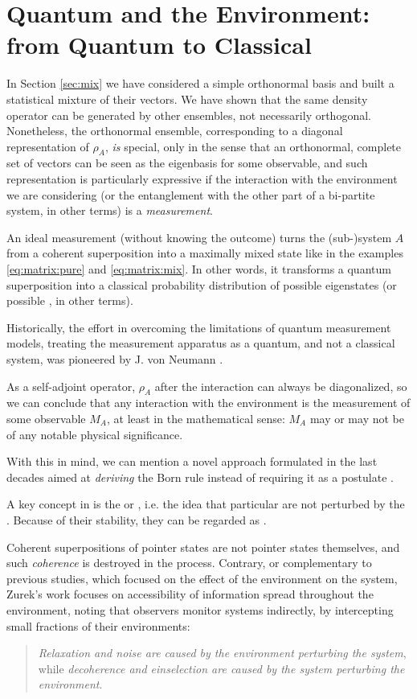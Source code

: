 \section{Quantum and the Environment: from Quantum to Classical}
\label{sec:q2c}

In Section \ref{sec:mix} we have considered a simple orthonormal basis
and built a statistical mixture of their vectors. We have shown
that the same density operator can be generated by other ensembles,
not necessarily orthogonal. Nonetheless, the orthonormal ensemble,
corresponding to a diagonal representation of $\rho_A$, \emph{is}
special, only in the sense that an orthonormal, complete set of
vectors can be seen as the eigenbasis for some observable,
and such representation is particularly expressive if the
interaction with the environment we are considering
(or the entanglement with the other part of a bi-partite system, in other terms)
is a \emph{measurement}.

An ideal measurement (without knowing the outcome) turns
the (sub-)system $A$ from a coherent superposition into a
maximally mixed state like in the examples
\eqref{eq:matrix:pure} and \eqref{eq:matrix:mix}.
In other words, it transforms a quantum superposition into a classical probability
distribution of possible eigenstates (or possible , in other terms).

Historically,
the effort in overcoming the limitations of quantum measurement models,
treating the measurement apparatus as a quantum,
and not a classical system,
was pioneered by J. von Neumann \parencite{VonNeumann}.

As a self-adjoint operator, $\rho_A$ after the interaction
can always be diagonalized, so we can conclude that any
interaction with the environment is the measurement of some
observable $M_A$, at least in the mathematical sense: $M_A$ may or
may not be of any notable physical significance.

With this in mind, we can mention
a novel approach formulated in the last decades aimed at
\emph{deriving}
the Born rule
instead of requiring it as a postulate
\parencite{Zurek_Einselect}.

A key concept in \cite{Zurek_Einselect} is the
 or ,
i.e. the idea that particular  are not
perturbed by the .
Because of their stability, they can be regarded as
.

Coherent superpositions of pointer states are not pointer states
themselves, and such \emph{coherence} is destroyed in the process. 
Contrary,
or complementary to previous studies, which focused on the effect of
the environment on the system, Zurek's work
focuses on
accessibility of information spread throughout the environment,
noting that observers monitor systems indirectly, by intercepting
small fractions of their environments:
\begin{quote}
\emph{Relaxation and noise are caused by the environment perturbing
the system}, while \emph{decoherence and einselection
are caused by the system perturbing the environment}.
\end{quote}
